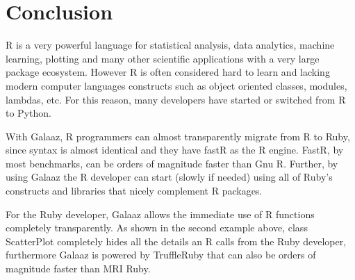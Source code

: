 \documentclass[]{article}
\begin{document}
\section{Conclusion}\label{conclusion}

R is a very powerful language for statistical analysis, data analytics,
machine learning, plotting and many other scientific applications with a
very large package ecosystem. However R is often considered hard to
learn and lacking modern computer languages constructs such as object
oriented classes, modules, lambdas, etc. For this reason, many
developers have started or switched from R to Python.

With Galaaz, R programmers can almost transparently migrate from R to
Ruby, since syntax is almost identical and they have fastR as the R
engine. FastR, by most benchmarks, can be orders of magnitude faster
than Gnu R. Further, by using Galaaz the R developer can start (slowly
if needed) using all of Ruby's constructs and libraries that nicely
complement R packages.

For the Ruby developer, Galaaz allows the immediate use of R functions
completely transparently. As shown in the second example above, class
ScatterPlot completely hides all the details an R calls from the Ruby
developer, furthermore Galaaz is powered by TruffleRuby that can also be
orders of magnitude faster than MRI Ruby.
\end{document}
